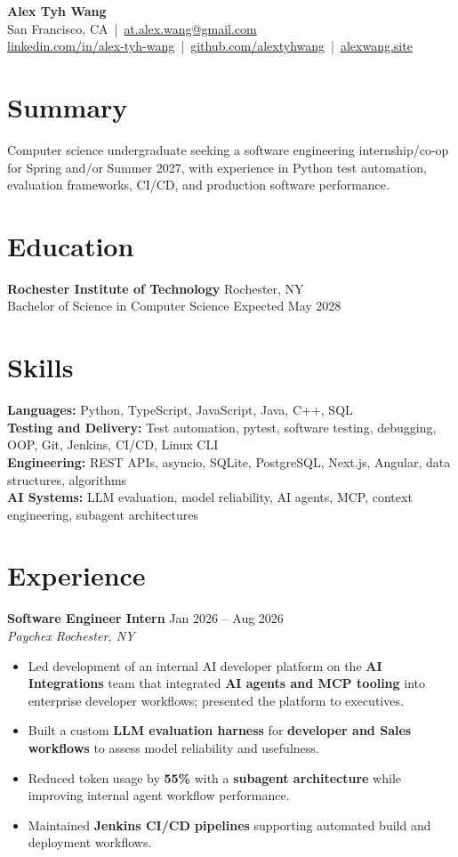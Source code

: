 \documentclass[10pt,letterpaper]{article}
\newif\ifresumeFirstRole
\newcommand{\resumeRole}[4]{%
  \ifresumeFirstRole
    \global\resumeFirstRolefalse
  \else
    \vspace{0pt plus 1fill}%
  \fi
  \textbf{#1} \hfill #2\\
  \textit{#3} \hfill \textit{#4}
}
\begin{document}
\begin{center}
{\Large \textbf{Alex Tyh Wang}}\\
San Francisco, CA \,|\, \href{mailto:at.alex.wang@gmail.com}{at.alex.wang@gmail.com}\\
\small \href{https://www.linkedin.com/in/alex-tyh-wang/}{linkedin.com/in/alex-tyh-wang} \,|\, \href{https://github.com/alextyhwang}{github.com/alextyhwang} \,|\, \href{https://alexwang.site}{alexwang.site}
\end{center}

\section*{Summary}
Computer science undergraduate seeking a software engineering internship/co-op for Spring and/or Summer 2027, with experience in Python test automation, evaluation frameworks, CI/CD, and production software performance.

\section*{Education}
\textbf{Rochester Institute of Technology} \hfill Rochester, NY\\
Bachelor of Science in Computer Science \hfill Expected May 2028

\section*{Skills}
\textbf{Languages:} Python, TypeScript, JavaScript, Java, C++, SQL\\
\textbf{Testing and Delivery:} Test automation, pytest, software testing, debugging, OOP, Git, Jenkins, CI/CD, Linux CLI\\
\textbf{Engineering:} REST APIs, asyncio, SQLite, PostgreSQL, Next.js, Angular, data structures, algorithms\\
\textbf{AI Systems:} LLM evaluation, model reliability, AI agents, MCP, context engineering, subagent architectures

\section*{Experience}
\resumeRole{Software Engineer Intern}{Jan 2026 -- Aug 2026}{Paychex}{Rochester, NY}
\begin{itemize}
  \item Led development of an internal AI developer platform on the \textbf{AI Integrations} team that integrated \textbf{AI agents and MCP tooling} into enterprise developer workflows; presented the platform to executives.
  \item Built a custom \textbf{LLM evaluation harness} for \textbf{developer and Sales workflows} to assess model reliability and usefulness.
  \item Reduced token usage by \textbf{55\%} with a \textbf{subagent architecture} while improving internal agent workflow performance.
  \item Maintained \textbf{Jenkins CI/CD pipelines} supporting automated build and deployment workflows.
\end{itemize}
\end{document}
